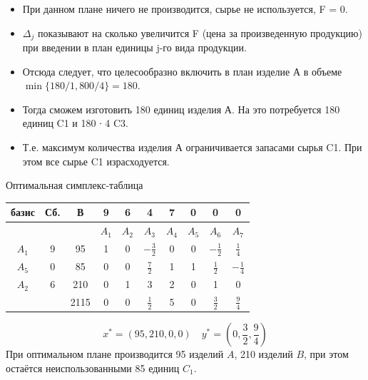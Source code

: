 \documentclass[17pt]{extarticle}
\begin{document}
\begin{itemize}
    \item При данном плане ничего не производится, сырье не используется, F = 0.
    \item $\Delta_j$ показывают на сколько увеличится F (цена за произведенную продукцию) при введении в план единицы j-го вида продукции.
    \item Отсюда следует, что целесообразно включить в план изделие А в объеме $\min\{180/1, 800/4\}= 180$.
    \item Тогда сможем изготовить 180 единиц изделия А. На это потребуется 180 единиц C1 и 180 ∙ 4 C3.
    \item Т.е. максимум количества изделия А ограничивается запасами сырья C1. При этом все сырье C1 израсходуется.
\end{itemize}
Оптимальная симплекс-таблица
\begin{center}
    \begin{tabular}{|c|c|c|c|c|c|c|c|c|c|}
        \hline
        \textbf{базис} & \textbf{Сб.} & \textbf{В} & \textbf{9} & \textbf{6} & \textbf{4}       & \textbf{7} & \textbf{0} & \textbf{0}       & \textbf{0}       \\
        \hline
                       &              &            & \( A_1 \)  & \( A_2 \)  & \( A_3 \)        & \( A_4 \)  & \( A_5 \)  & \( A_6 \)        & \( A_7 \)        \\
        \hline
        \( A_1 \)      & 9            & 95         & 1          & 0          & \(-\frac{3}{2}\) & 0          & 0          & \(-\frac{1}{2}\) & \(\frac{1}{4}\)  \\
        \hline
        \( A_5 \)      & 0            & 85         & 0          & 0          & \(\frac{7}{2}\)  & 1          & 1          & \(\frac{1}{2}\)  & \(-\frac{1}{4}\) \\
        \hline
        \( A_2 \)      & 6            & 210        & 0          & 1          & 3                & 2          & 0          & 1                & 0                \\
        \hline
                       &              & 2115       & 0          & 0          & \(\frac{1}{2}\)  & 5          & 0          & \(\frac{3}{2}\)  & \(\frac{9}{4}\)  \\
        \hline
    \end{tabular}
\end{center}
\[
    x^* = (95, 210, 0, 0) \quad y^* = \left(0, \frac{3}{2}, \frac{9}{4}\right)
\]
При оптимальном плане производится 95 изделий \( A \), 210 изделий \( B \), при этом остаётся неиспользованными 85 единиц \( C_1 \).
\end{document}
